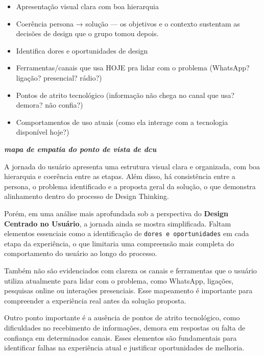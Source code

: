 \documentclass[
  sigconf,
  nonacm, %
  language=portuguese
]{acmart}
\begin{document}
\begin{itemize}[leftmargin=14pt,itemsep=1pt,topsep=3pt,parsep=0pt]
  \item[\textcolor{cgood}{$\checkmark$}] {\small\textcolor{cgood}{Apresentação visual clara com boa hierarquia}}
  \item[\textcolor{cgood}{$\checkmark$}] {\small\textcolor{cgood}{Coerência persona → solução — os objetivos e o contexto sustentam as decisões de design que o grupo tomou depois.}}
  \item[$\square$] {\small\textcolor{cmuted}{Identifica dores e oportunidades de design}}
  \item[$\square$] {\small\textcolor{cmuted}{Ferramentas/canais que usa HOJE pra lidar com o problema (WhatsApp? ligação? presencial? rádio?)}}
  \item[$\square$] {\small\textcolor{cmuted}{Pontos de atrito tecnológico (informação não chega no canal que usa? demora? não confia?)}}
  \item[\textcolor{cgood}{$\checkmark$}] {\small\textcolor{cgood}{Comportamentos de uso atuais (como ela interage com a tecnologia disponível hoje?)}}
\end{itemize}

\textit{\textbf{mapa de empatia do ponto de vista de dcu}}

A jornada do usuário apresenta uma estrutura visual clara e organizada, com boa hierarquia e coerência entre as etapas. Além disso, há consistência entre a persona, o problema identificado e a proposta geral da solução, o que demonstra alinhamento dentro do processo de Design Thinking.

Porém, em uma análise mais aprofundada sob a perspectiva do \textbf{Design Centrado no Usuário}, a jornada ainda se mostra simplificada. Faltam elementos essenciais como a identificação de \texttt{dores e oportunidades} em cada etapa da experiência, o que limitaria uma compreensão mais completa do comportamento do usuário ao longo do processo.

Também não são evidenciados com clareza os canais e ferramentas que o usuário utiliza atualmente para lidar com o problema, como WhatsApp, ligações, pesquisas online ou interações presenciais. Esse mapeamento é importante para compreender a experiência real antes da solução proposta.

Outro ponto importante é a ausência de pontos de atrito tecnológico, como dificuldades no recebimento de informações, demora em respostas ou falta de confiança em determinados canais. Esses elementos são fundamentais para identificar falhas na experiência atual e justificar oportunidades de melhoria.
\end{document}
